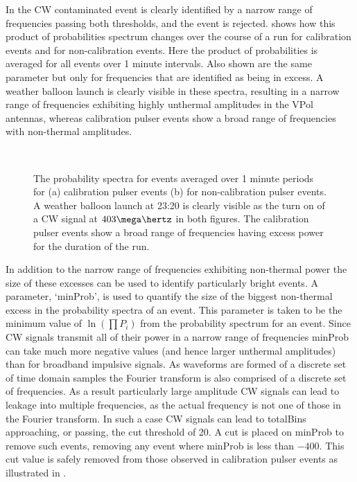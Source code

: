 In  the CW contaminated event is clearly identified by a narrow range of frequencies passing both thresholds, and the event is rejected.  shows how this product of probabilities spectrum changes over the course of a run for calibration events and for non-calibration events. Here the product of probabilities is averaged for all events over 1 minute intervals. Also shown are the same parameter but only for frequencies that are identified as being in excess. A weather balloon launch is clearly visible in these spectra, resulting in a narrow range of frequencies exhibiting highly unthermal amplitudes in the VPol antennas, whereas calibration pulser events show a broad range of frequencies with non-thermal amplitudes.


\begin{figure}[htpb]
  \hfill
  \\
  \hfill
  \caption{The probability spectra for events averaged over 1 minute periods for (a) calibration pulser events (b) for non-calibration pulser events. A weather balloon launch at 23:20 is clearly visible as the turn on of a CW signal at $403 \mega \hertz$ in both figures. The calibration pulser events show a broad range of frequencies having excess power for the duration of the run.}
  \label{fig:analysis:CWRemoval:Filtering:CW-Time}
\end{figure}


In addition to the narrow range of frequencies exhibiting non-thermal power the size of these excesses can be used to identify particularly bright events. A parameter, `minProb', is used to quantify the size of the biggest non-thermal excess in the probability spectra of an event. This parameter is taken to be the minimum value of $\ln(\prod P_{i})$ from the probability spectrum for an event. Since CW signals transmit all of their power in a narrow range of frequencies minProb can take much more negative values (and hence larger unthermal amplitudes) than for broadband impulsive signals. As waveforms are formed of a discrete set of time domain samples the Fourier transform is also comprised of a discrete set of frequencies. As a result particularly large amplitude CW signals can lead to leakage into multiple frequencies, as the actual frequency is not one of those in the Fourier transform. In such a case CW signals can lead to totalBins approaching, or passing, the cut threshold of 20. A cut is placed on minProb to remove such events, removing any event where minProb is less than $-400$. This cut value is safely removed from those observed in calibration pulser events as illustrated in .

